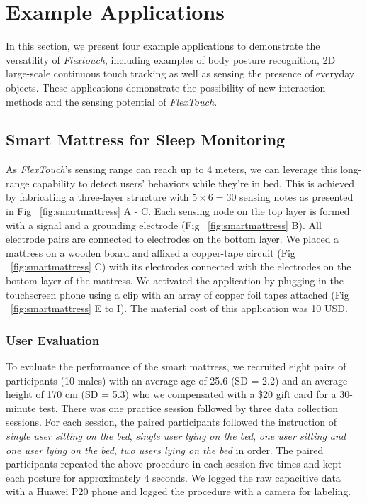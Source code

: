 \chapter{Example Applications}
In this section, we present four example applications to demonstrate the versatility of \textit{Flextouch}, including examples of body posture recognition, 2D large-scale continuous touch tracking as well as sensing the presence of everyday objects. These applications demonstrate the possibility of new interaction methods and the sensing potential of \emph{FlexTouch}.

\section{Smart Mattress for Sleep Monitoring}
As \textit{FlexTouch}'s sensing range can reach up to 4 meters, we can leverage this long-range capability to detect users' behaviors while they're in bed. This is achieved by fabricating a three-layer structure with $5 \times 6 = 30$ sensing notes as presented in Fig ~\ref{fig:smartmattress} A - C. Each sensing node on the top layer is formed with a signal and a grounding electrode (Fig ~\ref{fig:smartmattress} B). All electrode pairs are connected to electrodes on the bottom layer. We placed a mattress on a wooden board and affixed a copper-tape circuit (Fig ~\ref{fig:smartmattress} C) with its electrodes connected with the electrodes on the bottom layer of the mattress. We activated the application by plugging in the touchscreen phone using a clip with an array of copper foil tapes attached (Fig ~\ref{fig:smartmattress} E to I). The material cost of this application was 10 USD.


\subsection{User Evaluation}
To evaluate the performance of the smart mattress, we recruited eight pairs of participants (10 males) with an average age of 25.6 (SD = 2.2) and an average height of 170 cm (SD = 5.3) who we compensated with a \$20 gift card for a 30-minute test. There was one practice session followed by three data collection sessions. For each session, the paired participants followed the instruction of \textit{single user sitting on the bed}, \textit{single user lying on the bed}, \textit{one user sitting and one user lying on the bed}, \textit{two users lying on the bed} in order. The paired participants repeated the above procedure in each session five times and kept each posture for approximately 4 seconds. We logged the raw capacitive data with a Huawei P20 phone and logged the procedure with a camera for labeling. 

